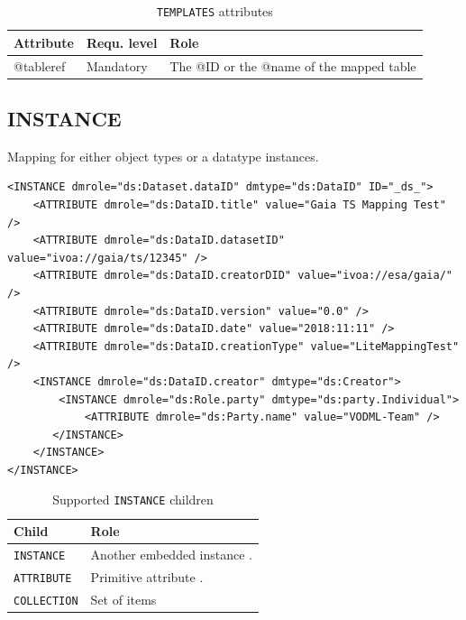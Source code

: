 \documentclass[11pt,a4paper]{ivoa}
\begin{document}
\begin{table}[!htbp]
     \begin{tabular}{|p{2cm}|p{3cm}|p{7.5cm}|}
       \hline Attribute & Requ. level & Role\\
       \hline  @tableref  & Mandatory & The @ID or the @name of the mapped table  \\
       \hline 
     \end{tabular}
     \caption{\texttt{TEMPLATES} attributes} 
     \label{tbl:templ-att}
 \end{table}


\subsection{INSTANCE}

Mapping for either object types or a datatype instances.


\begin{lstlisting}[caption={INSTANCE bloc example},captionpos=b]
<INSTANCE dmrole="ds:Dataset.dataID" dmtype="ds:DataID" ID="_ds_">
    <ATTRIBUTE dmrole="ds:DataID.title" value="Gaia TS Mapping Test" />
    <ATTRIBUTE dmrole="ds:DataID.datasetID" value="ivoa://gaia/ts/12345" />
    <ATTRIBUTE dmrole="ds:DataID.creatorDID" value="ivoa://esa/gaia/" />
    <ATTRIBUTE dmrole="ds:DataID.version" value="0.0" />
    <ATTRIBUTE dmrole="ds:DataID.date" value="2018:11:11" />
    <ATTRIBUTE dmrole="ds:DataID.creationType" value="LiteMappingTest" />
    <INSTANCE dmrole="ds:DataID.creator" dmtype="ds:Creator">
        <INSTANCE dmrole="ds:Role.party" dmtype="ds:party.Individual">
            <ATTRIBUTE dmrole="ds:Party.name" value="VODML-Team" />
       </INSTANCE>
    </INSTANCE>
</INSTANCE>
\end{lstlisting}


\begin{table}[!htbp]
     \begin{tabular}{|p{5cm}|p{9cm}|}
       \hline Child &  Role\\
       \hline  \texttt{INSTANCE}    & Another embedded instance . \\       
       \hline  \texttt{ATTRIBUTE}    & Primitive attribute . \\       
       \hline  \texttt{COLLECTION}    & Set of items\\      
       \hline 
     \end{tabular}
     \caption{Supported  \texttt{INSTANCE} children} 
     \label{tbl:inst-chilrdren}
\end{table}
\end{document}
